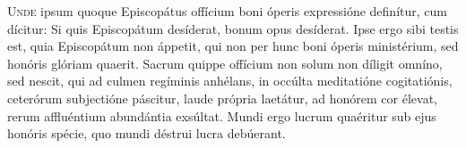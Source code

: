 
\lettrine{U}{nde} ipsum quoque Episcopátus offícium boni óperis
expressióne definítur, cum dícitur:
Si quis Episcopátum desíderat, bonum opus desíderat.
Ipse ergo sibi testis est, quia Episcopátum non áppetit,
qui non per hunc boni óperis ministérium,
sed honóris glóriam quaerit.
Sacrum quippe offícium non solum non díligit omníno,
sed nescit, qui ad culmen regíminis anhélans,
in occúlta meditatióne cogitatiónis,
ceterórum subjectióne páscitur,
laude própria laetátur,
ad honórem cor élevat,
rerum affluéntium abundántia exsúltat.
Mundi ergo lucrum quaéritur sub ejus honóris spécie,
quo mundi déstrui lucra debúerant.
